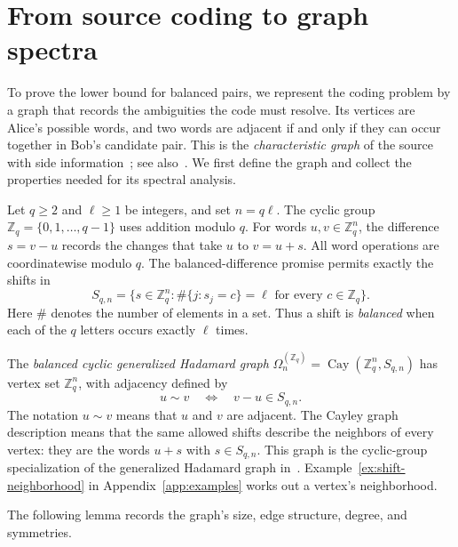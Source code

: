 \documentclass[11pt,a4paper]{article}
\numberwithin{equation}{section}
\numberwithin{figure}{section}
\numberwithin{table}{section}
\numberwithin{footnote}{section}
\theoremstyle{informal}\newtheorem*{informaltheorem}{Informal theorem}
\theoremstyle{definition}\newtheorem{example}{Example}[section]
\theoremstyle{remark}\newtheorem{remark}[theorem]{Remark}
\newcommand{\Z}{\mathbb Z}
\newcommand{\Om}{\Omega_n^{(\Z_q)}}
\begin{document}
\section{From source coding to graph spectra}\label{sec:graph}

To prove the lower bound for balanced pairs, we represent the coding
problem by a graph that records the ambiguities the code must resolve.
Its vertices are Alice's possible words, and two words are adjacent
if and only if they can occur together in Bob's candidate pair.
This is the \emph{characteristic graph} of the source with side
information~\cite{wits,fb}; see also~\cite[Sec.~1.1]{bblps}.
We first define the graph and collect the properties needed for its
spectral analysis.

Let \(q\geq2\) and \(\ell\geq1\) be integers, and set \(n=q\ell\).
The cyclic group \(\Z_q=\{0,1,\ldots,q-1\}\) uses addition modulo
\(q\). For words \(u,v\in\Z_q^n\), the difference \(s=v-u\)
records the changes that take \(u\) to \(v=u+s\). All word
operations are coordinatewise modulo \(q\). The balanced-difference
promise permits exactly the shifts in
\begin{equation}\label{eq:allowed-shifts}
 S_{q,n}=\bigl\{s\in\Z_q^n:
       \#\{j:s_j=c\}=\ell\text{ for every }c\in\Z_q\bigr\}.
\end{equation}
Here \(\#\) denotes the number of elements in a set. Thus a shift is
\emph{balanced} when each of the \(q\) letters occurs exactly
\(\ell\) times.

The \emph{balanced cyclic generalized Hadamard graph}
\(\Om=\operatorname{Cay}(\Z_q^n,S_{q,n})\) has vertex set
\(\Z_q^n\), with adjacency defined by
\begin{equation}\label{eq:adjacency-definition}
 u\sim v\quad\Longleftrightarrow\quad v-u\in S_{q,n}.
\end{equation}
The notation \(u\sim v\) means that \(u\) and \(v\) are adjacent.
The Cayley graph description means that the same allowed shifts
describe the neighbors of every vertex: they are the words \(u+s\)
with \(s\in S_{q,n}\). This graph is the cyclic-group specialization
of the generalized Hadamard graph in~\cite[Sec.~2.3]{cao}. Example~\ref{ex:shift-neighborhood} in Appendix~\ref{app:examples}
works out a vertex's neighborhood.

The following lemma records the graph's size, edge structure, degree,
and symmetries.
\end{document}
